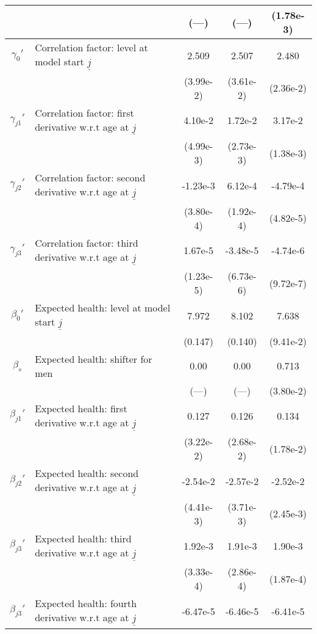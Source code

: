\begin{table}
\begin{center}
{\begin{tabular}{clccc}
\rule{0pt}{2.2ex} & & (---) & (---) & (1.78e-3) \\
\hline
\rule{0pt}{2.2ex}$\gamma_{0}'$ & Correlation factor: level at model start $\underline{j}$ & 2.509 & 2.507 & 2.480 \\
\rule{0pt}{2.2ex} & & (3.99e-2) & (3.61e-2) & (2.36e-2) \\
\rule{0pt}{2.2ex}$\gamma_{j1}'$ & Correlation factor: first derivative w.r.t age at $\underline{j}$ & 4.10e-2 & 1.72e-2 & 3.17e-2 \\
\rule{0pt}{2.2ex} & & (4.99e-3) & (2.73e-3) & (1.38e-3) \\
\rule{0pt}{2.2ex}$\gamma_{j2}'$ & Correlation factor: second derivative w.r.t age at $\underline{j}$ & -1.23e-3 & 6.12e-4 & -4.79e-4 \\
\rule{0pt}{2.2ex} & & (3.80e-4) & (1.92e-4) & (4.82e-5) \\
\rule{0pt}{2.2ex}$\gamma_{j3}'$ & Correlation factor: third derivative w.r.t age at $\underline{j}$ & 1.67e-5 & -3.48e-5 & -4.74e-6 \\
\rule{0pt}{2.2ex} & & (1.23e-5) & (6.73e-6) & (9.72e-7) \\
\hline
\rule{0pt}{2.2ex}$\beta_{0}'$ & Expected health: level at model start $\underline{j}$ & 7.972 & 8.102 & 7.638 \\
\rule{0pt}{2.2ex} & & (0.147) & (0.140) & (9.41e-2) \\
\rule{0pt}{2.2ex}$\beta_{s}$ & Expected health: shifter for men & 0.00 & 0.00 & 0.713 \\
\rule{0pt}{2.2ex} & & (---) & (---) & (3.80e-2) \\
\rule{0pt}{2.2ex}$\beta_{j1}'$ & Expected health: first derivative w.r.t age at $\underline{j}$ & 0.127 & 0.126 & 0.134 \\
\rule{0pt}{2.2ex} & & (3.22e-2) & (2.68e-2) & (1.78e-2) \\
\rule{0pt}{2.2ex}$\beta_{j2}'$ & Expected health: second derivative w.r.t age at $\underline{j}$ & -2.54e-2 & -2.57e-2 & -2.52e-2 \\
\rule{0pt}{2.2ex} & & (4.41e-3) & (3.71e-3) & (2.45e-3) \\
\rule{0pt}{2.2ex}$\beta_{j3}'$ & Expected health: third derivative w.r.t age at $\underline{j}$ & 1.92e-3 & 1.91e-3 & 1.90e-3 \\
\rule{0pt}{2.2ex} & & (3.33e-4) & (2.86e-4) & (1.87e-4) \\
\rule{0pt}{2.2ex}$\beta_{j3}'$ & Expected health: fourth derivative w.r.t age at $\underline{j}$ & -6.47e-5 & -6.46e-5 & -6.41e-5 \\

\end{tabular}}
\end{center}
\end{table}
